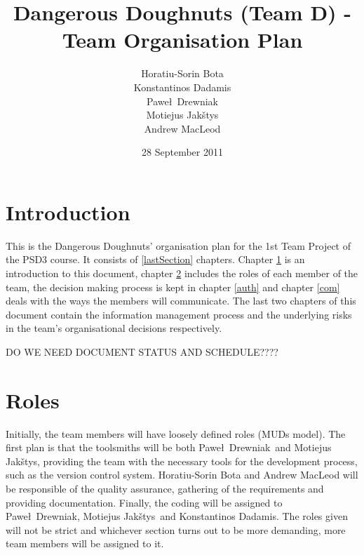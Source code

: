 \documentclass{article}
\newcommand{\pawel}{Pawe\l}
\newcommand{\jakstys}{Jak\v{s}tys}
\begin{document}
\title{Dangerous Doughnuts (Team D) - Team Organisation Plan} %
\author{Horatiu-Sorin Bota \\
		Konstantinos Dadamis \\
		\pawel\ Drewniak \\
		Motiejus \jakstys \\
		Andrew MacLeod} %

\date{28 September 2011}
\maketitle

\section{Introduction}
\label{intro}

This is the Dangerous Doughnuts' organisation plan for the 1st Team
Project of the PSD3 course. It consists of \ref{lastSection}
chapters. Chapter \ref{intro} is an introduction to this document,
chapter \ref{role} includes the roles of each member of the team, the decision making process is kept in chapter \ref{auth} and chapter \ref{com} deals with the ways the members will communicate. The last two chapters of this document contain the information management process and the underlying risks in the team's organisational decisions respectively.

DO WE NEED DOCUMENT STATUS AND SCHEDULE????


\section{Roles}
\label{role}

Initially, the team members will have loosely defined roles (MUDs model). The first plan is that the toolsmiths will be both \pawel\ Drewniak\ and Motiejus \jakstys, providing the team with the necessary tools for the development process, such as the version control system. Horatiu-Sorin Bota and Andrew MacLeod will be responsible of the quality assurance, gathering of the requirements and providing documentation. Finally, the coding will be assigned to \pawel\ Drewniak, Motiejus \jakstys\ and Konstantinos Dadamis. The roles given will not be strict and whichever section turns out to be more demanding, more team members will be assigned to it.  
\end{document}

